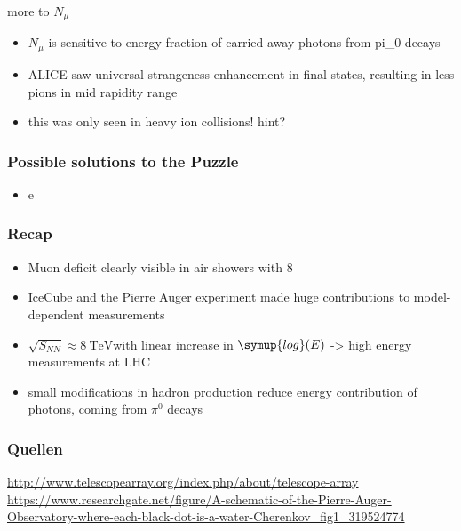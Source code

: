 \documentclass[aspectratio=1610, 9pt]{beamer}
\begin{document}
\begin{frame}{more to $N_\mu$}
  \begin{itemize}
    \item $N_\mu$ is sensitive to energy fraction of carried away photons from pi_0 decays
    \item ALICE saw universal strangeness enhancement in final states, resulting in less pions in mid rapidity range
    \item this was only seen in heavy ion collisions! hint?
  \end{itemize}
\end{frame}


\begin{frame}\frametitle{Possible solutions to the Puzzle}
  \begin{itemize}
    \item e
  \end{itemize}
\end{frame}

\begin{frame}\frametitle{Recap}
  \begin{itemize}
    \item Muon deficit clearly visible in air showers with 8\sigma
    \item IceCube and the Pierre Auger experiment made huge contributions to model-dependent measurements
    \item $\sqrt{S_{NN}} \approx \SI{8}{\tera\electronvolt}$with linear increase in $\symup{log}(E)$ -> high energy measurements at LHC
    \item small modifications in hadron production reduce energy contribution of photons, coming from $\pi^{0}$ decays
  \end{itemize}
\end{frame}

\begin{frame}\frametitle{Quellen}
\url{http://www.telescopearray.org/index.php/about/telescope-array} \\
\url{https://www.researchgate.net/figure/A-schematic-of-the-Pierre-Auger-Observatory-where-each-black-dot-is-a-water-Cherenkov_fig1_319524774} \\
\end{frame}
\end{document}
